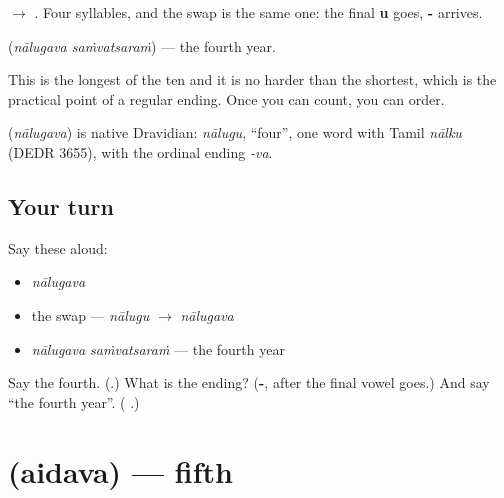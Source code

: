 \textbf{} $\to$ \textbf{}. Four syllables, and the swap is the same one: the final \textbf{u} goes, \textbf{-} arrives.

\textbf{ } (\emph{nālugava saṁvatsaraṁ}) — the fourth year.

This is the longest of the ten and it is no harder than the shortest, which is the practical point of a regular ending. Once you can count, you can order.

\begin{cousinweb}
\textbf{} (\emph{nālugava}) is native Dravidian: \emph{nālugu}, \textquotedblleft{}four\textquotedblright{}, one word with Tamil \emph{nālku} (DEDR 3655), with the ordinal ending \emph{-va}.
\end{cousinweb}

\subsection*{Your turn}
Say these aloud:

\begin{itemize}
\raggedright
  \item \emph{nālugava}
  \item the swap — \emph{nālugu} $\to$ \emph{nālugava}
  \item \emph{nālugava saṁvatsaraṁ} — the fourth year
\end{itemize}

\begin{tcolorbox}[breakable,colback=teal!4,colframe=teal!35!black,title={Before you move on}]
Say the fourth. (\textbf{}.) What is the ending? (\textbf{-}, after the final vowel goes.) And say \textquotedblleft{}the fourth year\textquotedblright{}. (\textbf{ }.)
\end{tcolorbox}
\section[\texorpdfstring{\te{ఐదవ} (aidava)}{ఐదవ (aidava)}]{ (aidava) — fifth}

\label{lesson:TE-C81-fifth}



